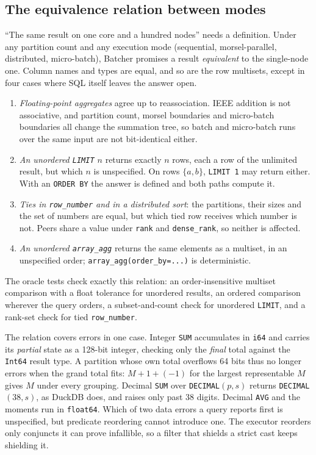 \documentclass[10pt,twocolumn,letterpaper]{article}   %
\newcommand{\sys}{Batcher}
\begin{document}
\subsection{The equivalence relation between modes}
\label{sec:equivalence}

``The same result on one core and a hundred nodes'' needs a definition. Under any partition
count and any execution mode (sequential, morsel-parallel, distributed, micro-batch), \sys{}
promises a result \emph{equivalent} to the single-node one. Column names and types are equal,
and so are the row multisets, except in four cases where SQL itself leaves the answer open.
\begin{enumerate}\itemsep0pt \parskip0pt 
\item \emph{Floating-point aggregates} agree up to reassociation. IEEE addition is not
associative, and partition count, morsel boundaries and micro-batch boundaries all change the
summation tree, so batch and micro-batch runs over the same input are not bit-identical either.
\item \emph{An unordered \texttt{LIMIT} $n$} returns exactly $n$ rows, each a row of the
unlimited result, but which $n$ is unspecified. On rows $\{a,b\}$, \texttt{LIMIT 1} may return
either. With an \texttt{ORDER BY} the answer is defined and both paths compute it.
\item \emph{Ties in \texttt{row\_number} and in a distributed sort}: the partitions, their
sizes and the set of numbers are equal, but which tied row receives which number is not.
Peers share a value under \texttt{rank} and \texttt{dense\_rank}, so neither is affected.
\item \emph{An unordered \texttt{array\_agg}} returns the same elements as a multiset, in an
unspecified order; \texttt{array\_agg(order\_by=...)} is deterministic.
\end{enumerate}
The oracle tests check exactly this relation: an order-insensitive multiset comparison with a
float tolerance for unordered results, an ordered comparison wherever the query orders, a
subset-and-count check for unordered \texttt{LIMIT}, and a rank-set check for tied
\texttt{row\_number}.

The relation covers errors in one case. Integer \texttt{SUM} accumulates in \texttt{i64} and
carries its \emph{partial} state as a 128-bit integer, checking only the \emph{final} total
against the \texttt{Int64} result type. A partition whose own total overflows 64 bits thus no
longer errors when the grand total fits: $M + 1 + (-1)$ for the largest representable $M$
gives $M$ under every grouping. Decimal \texttt{SUM} over \texttt{DECIMAL}$(p,s)$ returns
\texttt{DECIMAL}$(38,s)$, as DuckDB does, and raises only past 38 digits. Decimal
\texttt{AVG} and the moments run in \texttt{float64}. Which of two data errors a query reports
first is unspecified, but predicate reordering cannot introduce one. The executor reorders only
conjuncts it can prove infallible, so a filter that shields a strict cast keeps shielding it.
\end{document}
